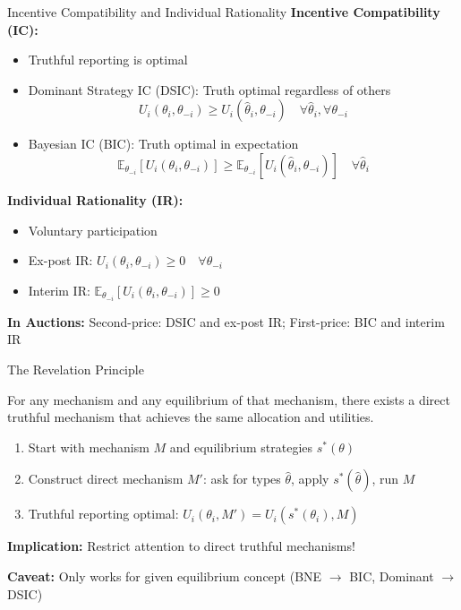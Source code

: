 \documentclass[xcolor={x11names}, aspectratio=169 ]{beamer}
\newcommand{\E}{\mathbb{E}}
\begin{document}
\begin{frame}{Incentive Compatibility and Individual Rationality}
\textbf{Incentive Compatibility (IC):}
\begin{itemize}
  \item Truthful reporting is optimal
  \item Dominant Strategy IC (DSIC): Truth optimal regardless of others
  \vspace{-0.1cm}
  $$U_i(\theta_i, \theta_{-i}) \geq U_i(\hat{\theta}_i, \theta_{-i}) \quad \forall \hat{\theta}_i, \forall \theta_{-i}$$
  \vspace{-0.3cm}
  \item Bayesian IC (BIC): Truth optimal in expectation
  \vspace{-0.1cm}
  $$\E_{\theta_{-i}}[U_i(\theta_i, \theta_{-i})] \geq \E_{\theta_{-i}}[U_i(\hat{\theta}_i, \theta_{-i})] \quad \forall \hat{\theta}_i$$
\end{itemize}
\vspace{-0.2cm}
\textbf{Individual Rationality (IR):}
\begin{itemize}
  \item Voluntary participation
  \item Ex-post IR: $U_i(\theta_i, \theta_{-i}) \geq 0 \quad \forall \theta_{-i}$
  \item Interim IR: $\E_{\theta_{-i}}[U_i(\theta_i, \theta_{-i})] \geq 0$
\end{itemize}
\vspace{-0.1cm}
\textbf{In Auctions:} Second-price: DSIC and ex-post IR; First-price: BIC and interim IR
\end{frame}

\begin{frame}{The Revelation Principle}
\begin{theorem}
For any mechanism and any equilibrium of that mechanism, there exists a direct truthful mechanism that achieves the same allocation and utilities.
\end{theorem}

\begin{proofbox}
\begin{enumerate}
  \item Start with mechanism $M$ and equilibrium strategies $s^*(\theta)$
  \item Construct direct mechanism $M'$: ask for types $\hat{\theta}$, apply $s^*(\hat{\theta})$, run $M$
  \item Truthful reporting optimal: $U_i(\theta_i, M') = U_i(s^*(\theta_i), M)$
\end{enumerate}
\end{proofbox}

\textbf{Implication:} Restrict attention to direct truthful mechanisms!

\textbf{Caveat:} Only works for given equilibrium concept (BNE $\rightarrow$ BIC, Dominant $\rightarrow$ DSIC)
\end{frame}
\end{document}
